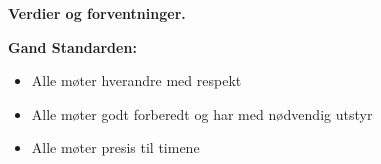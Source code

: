 

\centerline{\bf Verdier og forventninger. } \bigskip 


\noindent
{\bf Gand Standarden:}    
\begin{itemize}
\item{} Alle møter hverandre med respekt
\item{} Alle møter godt forberedt og har med nødvendig utstyr
\item{} Alle møter presis til timene
\end{itemize}
\vskip 10pt


